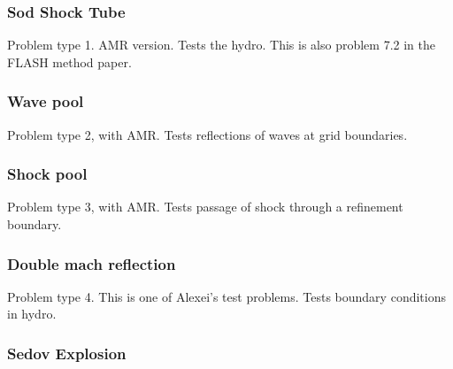 \subsubsection{Sod Shock Tube}
\label{sec.tests.sodshock}
Problem type 1.  AMR version.  Tests the hydro.
This is also problem 7.2 in the FLASH method paper.

\subsubsection{Wave pool}
\label{sec.tests.wavepool}
Problem type 2, with AMR.  Tests reflections of waves at grid boundaries.

\subsubsection{Shock pool}
\label{sec.tests.shockpool}
Problem type 3, with AMR.  Tests passage of shock through a refinement boundary.

\subsubsection{Double mach reflection}
\label{sec.tests.doublemach}
Problem type 4.  This is one of Alexei's test problems.  Tests
boundary conditions in hydro.

\subsubsection{Sedov Explosion}
\label{sec.tests.sedov}

